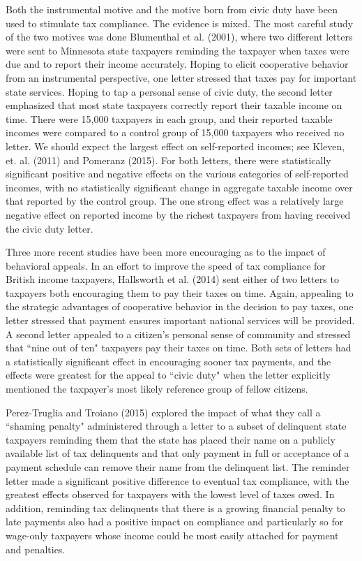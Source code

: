 \documentclass[12pt,titlepage]{article}
\begin{document}
Both the instrumental motive and the motive born from civic duty have
been used to stimulate tax compliance.  The evidence is mixed.  The
most careful study of the two motives was done Blumenthal et
al. (2001), where two different letters were sent to Minnesota state
taxpayers reminding the taxpayer when taxes were due and to report
their income accurately.  Hoping to elicit cooperative behavior from
an instrumental perspective, one letter stressed that taxes pay for
important state services.  Hoping to tap a personal sense of civic
duty, the second letter emphasized that most state taxpayers correctly
report their taxable income on time.  There were 15,000 taxpayers in
each group, and their reported taxable incomes were compared to a
control group of 15,000 taxpayers who received no letter.  We should
expect the largest effect on self-reported incomes; see Kleven,
et. al. (2011) and Pomeranz (2015).  For both letters, there were
statistically significant positive and negative effects on the various
categories of self-reported incomes, with no statistically significant
change in aggregate taxable income over that reported by the control
group.  The one strong effect was a relatively large negative effect
on reported income by the richest taxpayers from having received the
civic duty letter.

Three more recent studies have been more encouraging as to the impact
of behavioral appeals. In an effort to improve the speed of tax
compliance for British income taxpayers, Hallsworth et al. (2014) sent
either of two letters to taxpayers both encouraging them to pay their
taxes on time.  Again, appealing to the strategic advantages of
cooperative behavior in the decision to pay taxes, one letter stressed
that payment ensures important national services will be provided.  A
second letter appealed to a citizen's personal sense of community and
stressed that ``nine out of ten" taxpayers pay their taxes on time.
Both sets of letters had a statistically significant effect in
encouraging sooner tax payments, and the effects were greatest for the
appeal to ``civic duty" when the letter explicitly mentioned the 
taxpayer's most likely reference group of fellow citizens.

Perez-Truglia and Troiano (2015) explored the impact of what they call
a ``shaming penalty" administered through a letter to a subset of
delinquent state taxpayers reminding them that the state has placed
their name on a publicly available list of tax delinquents and that
only payment in full or acceptance of a payment schedule can remove
their name from the delinquent list.  The reminder letter made a
significant positive difference to eventual tax compliance, with the
greatest effects observed for taxpayers with the lowest level of taxes
owed.  In addition, reminding tax delinquents that there is a growing
financial penalty to late payments also had a positive impact on
compliance and particularly so for wage-only taxpayers whose income
could be most easily attached for payment and penalties.
\end{document}
